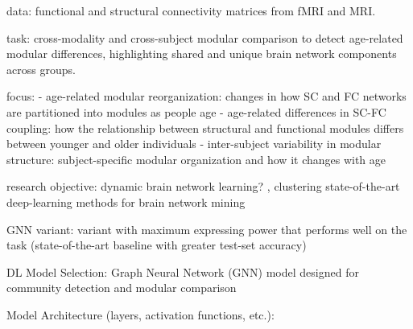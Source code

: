 data: functional and structural connectivity matrices from fMRI and MRI. 

task: cross-modality and cross-subject modular comparison 
to detect age-related modular differences, highlighting shared 
and unique brain network components across groups. 

focus: 
- age-related modular reorganization: changes in how SC and FC networks are partitioned 
    into modules as people age
- age-related differences in SC-FC coupling: how the relationship between structural and 
    functional modules differs between younger and older individuals
- inter-subject variability in modular structure: subject-specific modular organization 
    and how it changes with age
\cite{Puxeddu2022}

research objective: 
dynamic brain network learning? \cite{Tang2023}, 
clustering
state-of-the-art deep-learning methods for brain network mining

GNN variant: variant with maximum expressing power that performs
well on the task (state-of-the-art baseline with greater test-set
accuracy)

DL Model Selection: Graph Neural Network (GNN) model designed for 
community detection and modular comparison

Model Architecture (layers, activation functions, etc.):



